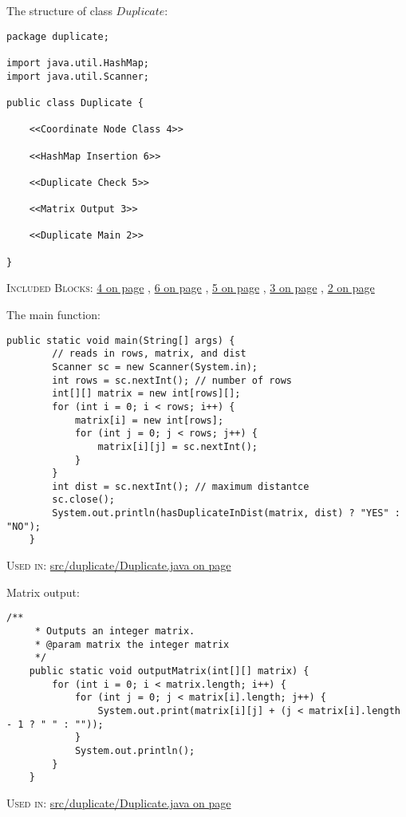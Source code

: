 The structure of class $Duplicate$:
\begin{lstlisting}[title={<src/duplicate/Duplicate.java 1>}, label=Listing1]
package duplicate;

import java.util.HashMap;
import java.util.Scanner;

public class Duplicate {

    <<Coordinate Node Class 4>>

    <<HashMap Insertion 6>>

    <<Duplicate Check 5>>

    <<Matrix Output 3>>

    <<Duplicate Main 2>>

}
\end{lstlisting}\begin{footnotesize} \textsc{Included Blocks}: \hyperref[Listing4]{4 on page} \pageref{Listing4}, \hyperref[Listing6]{6 on page} \pageref{Listing6}, \hyperref[Listing5]{5 on page} \pageref{Listing5}, \hyperref[Listing3]{3 on page} \pageref{Listing3}, \hyperref[Listing2]{2 on page} \pageref{Listing2}\end{footnotesize}\vskip 5mm\noindent
The main function:
\begin{lstlisting}[title={<Duplicate Main 2>}, label=Listing2]
    public static void main(String[] args) {
        // reads in rows, matrix, and dist
        Scanner sc = new Scanner(System.in);
        int rows = sc.nextInt(); // number of rows
        int[][] matrix = new int[rows][];
        for (int i = 0; i < rows; i++) {
            matrix[i] = new int[rows];
            for (int j = 0; j < rows; j++) {
                matrix[i][j] = sc.nextInt();
            }
        }
        int dist = sc.nextInt(); // maximum distantce
        sc.close();
        System.out.println(hasDuplicateInDist(matrix, dist) ? "YES" : "NO");
    }
\end{lstlisting}\begin{footnotesize} \textsc{Used in}: \hyperref[Listing1]{s\-r\-c\-/\-d\-u\-p\-l\-i\-c\-a\-t\-e\-/\-D\-u\-p\-l\-i\-c\-a\-t\-e\-.\-j\-a\-v\-a on page} \pageref{Listing1}  \end{footnotesize}\vskip 5mm\noindent
Matrix output:
\begin{lstlisting}[title={<Matrix Output 3>}, label=Listing3]
    /**
     * Outputs an integer matrix.
     * @param matrix the integer matrix
     */
    public static void outputMatrix(int[][] matrix) {
        for (int i = 0; i < matrix.length; i++) {
            for (int j = 0; j < matrix[i].length; j++) {
                System.out.print(matrix[i][j] + (j < matrix[i].length - 1 ? " " : ""));                
            }
            System.out.println();
        }
    }
\end{lstlisting}\begin{footnotesize} \textsc{Used in}: \hyperref[Listing1]{s\-r\-c\-/\-d\-u\-p\-l\-i\-c\-a\-t\-e\-/\-D\-u\-p\-l\-i\-c\-a\-t\-e\-.\-j\-a\-v\-a on page} \pageref{Listing1}  \end{footnotesize}\vskip 5mm\noindent
